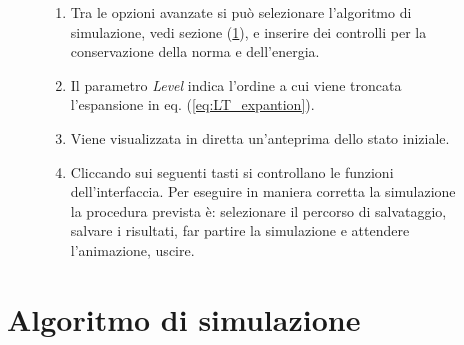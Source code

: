 \begin{figure}
{{\begin{enumerate}[nolistsep]
        \item Tra le opzioni avanzate si può selezionare l'algoritmo di simulazione, vedi sezione (\ref{sec:ev_code}), e inserire dei controlli per la conservazione della norma e dell'energia.
        \item Il parametro  \textsl{Level} indica l'ordine a cui viene troncata l'espansione in eq. (\ref{eq:LT_expantion}).
        \item Viene visualizzata in diretta un'anteprima dello stato iniziale.
        \item Cliccando sui seguenti tasti si controllano le funzioni dell'interfaccia. Per eseguire in maniera corretta la simulazione la procedura prevista è: selezionare il percorso di salvataggio, salvare i risultati, far partire la simulazione e attendere l'animazione, uscire.    
    \end{enumerate}
    } }
    \label{fig:interface}
\end{figure}

\section{Algoritmo di simulazione}
\label{sec:ev_code}

